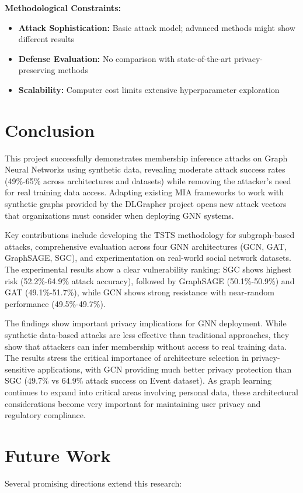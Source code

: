 \documentclass{article}
\begin{document}
\textbf{Methodological Constraints:}
\begin{itemize}
\item \textbf{Attack Sophistication:} Basic attack model; advanced methods might show different results
\item \textbf{Defense Evaluation:} No comparison with state-of-the-art privacy-preserving methods
\item \textbf{Scalability:} Computer cost limits extensive hyperparameter exploration
\end{itemize}

\section{Conclusion}
This project successfully demonstrates membership inference attacks on Graph Neural Networks using synthetic data, revealing moderate attack success rates (49\%-65\% across architectures and datasets) while removing the attacker's need for real training data access. Adapting existing MIA frameworks to work with synthetic graphs provided by the DLGrapher project opens new attack vectors that organizations must consider when deploying GNN systems.

Key contributions include developing the TSTS methodology for subgraph-based attacks, comprehensive evaluation across four GNN architectures (GCN, GAT, GraphSAGE, SGC), and experimentation on real-world social network datasets. The experimental results show a clear vulnerability ranking: SGC shows highest risk (52.2\%-64.9\% attack accuracy), followed by GraphSAGE (50.1\%-50.9\%) and GAT (49.1\%-51.7\%), while GCN shows strong resistance with near-random performance (49.5\%-49.7\%).

The findings show important privacy implications for GNN deployment. While synthetic data-based attacks are less effective than traditional approaches, they show that attackers can infer membership without access to real training data. The results stress the critical importance of architecture selection in privacy-sensitive applications, with GCN providing much better privacy protection than SGC (49.7\% vs 64.9\% attack success on Event dataset). As graph learning continues to expand into critical areas involving personal data, these architectural considerations become very important for maintaining user privacy and regulatory compliance.

\section{Future Work}
Several promising directions extend this research:
\end{document}
